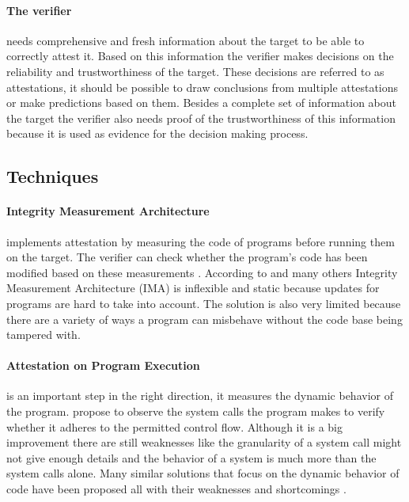 \documentclass{report}
\begin{document}
\paragraph*{The verifier}
needs comprehensive and fresh information about the target to be able to correctly attest it. Based on this information the verifier makes decisions on the reliability and trustworthiness of the target. These decisions are referred to as attestations, it should be possible to draw conclusions from multiple attestations or make predictions based on them. Besides a complete set of information about the target the verifier also needs proof of the trustworthiness of this information because it is used as evidence for the decision making process. 

\subsection*{Techniques}

\paragraph*{Integrity Measurement Architecture }
implements attestation by measuring the code of programs before running them on the target. The verifier can check whether the program's code has been modified based on these measurements \cite{YuAimin2008BAti} \cite{JaegerTrent2006Ppim} \cite{DuanJialiang2020IMBo} \cite{KucabMichal2021Raai}. According to \cite{AlamMasoom2012Aoer} and many others Integrity Measurement Architecture (IMA) is inflexible and static because updates for programs are hard to take into account. The solution is also very limited because there are a variety of ways a program can misbehave without the code base being tampered with.

\paragraph*{Attestation on Program Execution}
is an important step in the right direction, it measures the dynamic behavior of the program. \cite{GuLiang2008Raop} propose to observe the system calls the program makes to verify whether it adheres to the permitted control flow. Although it is a big improvement there are still weaknesses like the granularity of a system call might not give enough details and the behavior of a system is much more than the system calls alone. Many similar solutions that focus on the dynamic behavior of code have been proposed all with their weaknesses and shortcomings \cite{QinYu2020RRIP} \cite{AliToqeer2017Daio} \cite{StelteB2010Timi} \cite{BaHaihe2017RMAf}.
\end{document}
